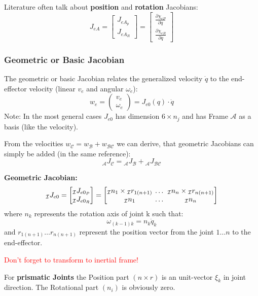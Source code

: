 \documentclass[fontsize=6pt,DIV=calc,a4paper,ngerman]{scrartcl}
\begin{document}
\begin{multicols*}{4}
	Literature often talk about \textbf{position} and \textbf{rotation} Jacobians:
	$$J_{eA} = \begin{bmatrix}
			J_{eA_p} \\ J_{eA_R}
		\end{bmatrix}
		= \begin{bmatrix}
			\frac{\partial \chi_{eP}}{\partial q} \\
			\frac{\partial \chi_{eR}}{\partial q}
		\end{bmatrix}
	$$
	\subsubsection{Geometric or Basic Jacobian}
	The geometric or basic Jacobian relates the generalized velocity $\dot{q}$ to the end-effector velocity (linear $v_e$ and angular $\omega_e$):
	$$w_e = \begin{pmatrix}v_e \\ \omega_e\end{pmatrix} = J_{e0}(q)\cdot \dot{q}$$
	Note: In the most general cases $J_{e0}$ has dimension $6\times n_j$ and has Frame $\mathcal{A}$ as a basis (like the velocity).

	\smallskip
	From the velocities $w_\mathcal{C} = w_\mathcal{B} + w_\mathcal{BC}$ we can derive, that geometric Jacobians can simply be added (in the same reference):
	$${}_\mathcal{A}J_\mathcal{C} = {}_\mathcal{A}J_\mathcal{B} +{}_\mathcal{A}J_\mathcal{BC}$$

	\smallskip
	\textbf{Geometric Jacobian:}
	$$ {}_\mathcal{I}J_{e0} =
		\begin{bmatrix}{}
			{}_\mathcal{I}J_{e0_P} \\ {}_\mathcal{I}J_{e0_R}
		\end{bmatrix}
		=
		\setlength\arraycolsep{2pt}
		\begin{bmatrix}{}
			{}_\mathcal{I}n_1 \times {}_\mathcal{I}r_{1(n+1)} & \dots & {}_\mathcal{I}n_n \times {}_\mathcal{I}r_{n(n+1)} \\
			{}_\mathcal{I}n_1                                 & \dots & {}_\mathcal{I}n_n
		\end{bmatrix}$$
	where $n_k$ represents the rotation axis of joint k such that: $$\omega_{(k-1)k} = n_k \dot{q}_k$$
	and $r_{1(n+1)} \dots r_{n(n+1)}$ represent the position vector from the joint $1 \dots n$ to the end-effector.

	\textcolor{red}{Don't forget to transform to inertial frame!}

	\smallskip
	For \textbf{prismatic Joints}  the Position part $(n\times r)$ is an unit-vector $\xi_k$ in joint direction. The Rotational part $(n_i)$ is obviously zero.


\end{multicols*}
\end{document}
